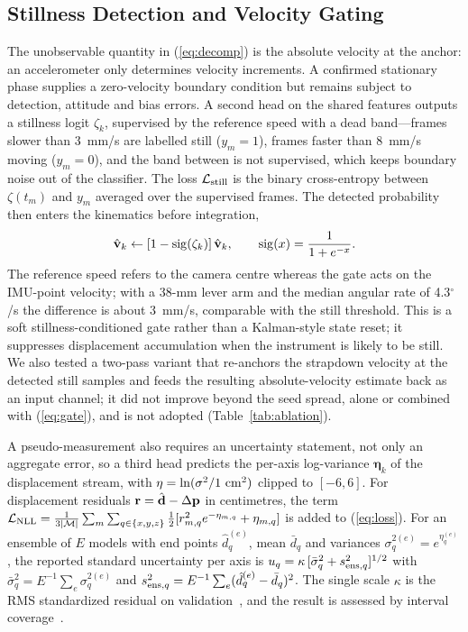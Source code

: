 \subsection{Stillness Detection and Velocity Gating}
The unobservable quantity in (\ref{eq:decomp}) is the absolute velocity at the
anchor: an accelerometer only determines velocity increments. A confirmed
stationary phase supplies a zero-velocity boundary condition but remains
subject to detection, attitude and bias errors. A second head on the shared
features outputs a stillness logit $\zeta_k$, supervised by the reference speed
with a dead band---frames slower than 3~mm/s are labelled still ($y_m=1$),
frames faster than 8~mm/s moving ($y_m=0$), and the band between is not
supervised, which keeps boundary noise out of the classifier. The loss
${\cal L}_{\rm still}$ is the binary cross-entropy between $\zeta(t_m)$ and
$y_m$ averaged over the supervised frames. The detected probability then
enters the kinematics before integration,
\begin{equation}
 \hat{\bf v}_k \leftarrow [1-\operatorname{sig}(\zeta_k)]\,\hat{\bf v}_k ,\qquad
 \operatorname{sig}(x)=\frac{1}{1+e^{-x}} .
 \label{eq:gate}
\end{equation}
The reference speed refers to the camera centre whereas the gate acts on the
IMU-point velocity; with a 38-mm lever arm and the median angular rate of
4.3$^\circ$/s the difference is about 3~mm/s, comparable with the still
threshold. This is a soft stillness-conditioned gate rather than a Kalman-style state
reset; it suppresses displacement accumulation when the instrument is likely
to be still. We also
tested a two-pass variant that re-anchors the strapdown velocity at the
detected still samples and feeds the resulting absolute-velocity estimate back
as an input channel; it did not improve beyond the seed spread, alone or
combined with (\ref{eq:gate}), and is not adopted (Table~\ref{tab:ablation}).

A pseudo-measurement also requires an uncertainty statement, not only an
aggregate error, so a third head predicts the per-axis log-variance
$\boldsymbol\eta_k$ of the displacement stream, with
$\eta=\ln(\sigma^2/1~{\rm cm}^2)$ clipped to $[-6,6]$. For displacement residuals
${\bf r}=\hat{\bf d}-\Delta{\bf p}$ in centimetres, the term
${\cal L}_{\rm NLL}=\frac{1}{3|{\cal M}|}\sum_{m}\sum_{q\in\{x,y,z\}}
\frac12[r_{m,q}^2e^{-\eta_{m,q}}+\eta_{m,q}]$ is added to (\ref{eq:loss}). For an
ensemble of $E$ models with end points $\hat d_q^{(e)}$, mean $\bar d_q$ and
variances $\sigma_q^{2(e)}=e^{\eta_q^{(e)}}$, the reported standard uncertainty
per axis is
$u_q=\kappa\,[\bar\sigma_q^2+s_{{\rm ens},q}^2]^{1/2}$ with
$\bar\sigma_q^2=E^{-1}\sum_e\sigma_q^{2(e)}$ and
$s_{{\rm ens},q}^2=E^{-1}\sum_e(\hat d_q^{(e)}-\bar d_q)^2$. The single scale
$\kappa$ is the RMS standardized residual on validation~\cite{laves2020well},
and the result is assessed by interval
coverage~\cite{kendall2017uncertainties,lakshminarayanan2017simple}.

